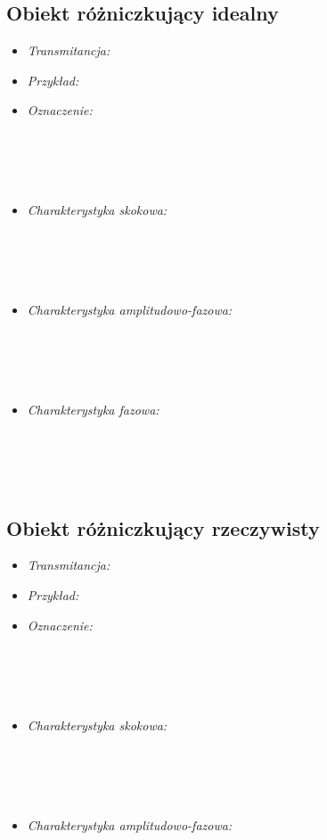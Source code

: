 \documentclass[a4paper]{article}
\begin{document}
\subsection{Obiekt różniczkujący idealny}
\begin{itemize}
\item \emph{Transmitancja: }
\item \emph{Przykład: }
\item \emph {Oznaczenie: } \\\\\\\\\\
\item \emph{Charakterystyka skokowa: } \\\\\\\\\\
\item \emph{Charakterystyka amplitudowo-fazowa: } \\\\\\\\\\
\item \emph{Charakterystyka fazowa: } \\\\\\\\\\
\end{itemize}
\subsection{Obiekt różniczkujący rzeczywisty}
\begin{itemize}
\item \emph{Transmitancja: }
\item \emph{Przykład: }
\item \emph {Oznaczenie: } \\\\\\\\\\
\item \emph{Charakterystyka skokowa: } \\\\\\\\\\
\item \emph{Charakterystyka amplitudowo-fazowa: } \\\\\\\\\\
\end{itemize}
\end{document}
